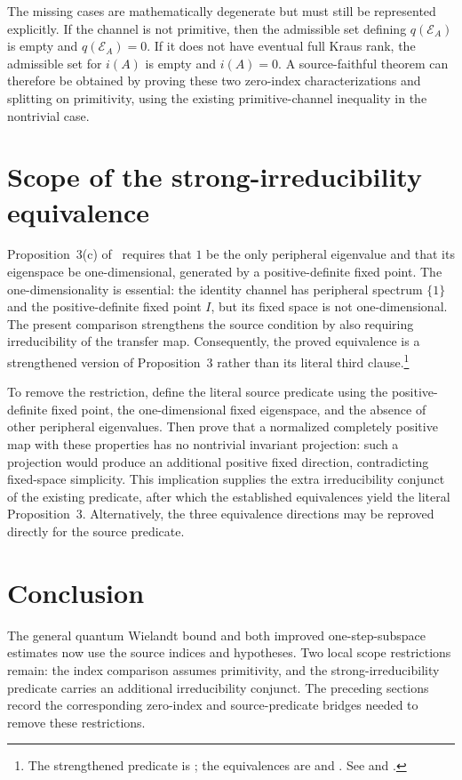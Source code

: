 \documentclass{article}
\begin{document}
The missing cases are mathematically degenerate but must still be represented
explicitly. If the channel is not primitive, then the admissible set defining
$q(\mathcal E_A)$ is empty and $q(\mathcal E_A)=0$. If it does not have
eventual full Kraus rank, the admissible set for $i(A)$ is empty and $i(A)=0$.
A source-faithful theorem can therefore be obtained by proving these two
zero-index characterizations and splitting on primitivity, using the existing
primitive-channel inequality in the nontrivial case.

\section{Scope of the strong-irreducibility equivalence}

Proposition~3(c) of~\cite{Sanz2010Quantum} requires that $1$ be the only
peripheral eigenvalue and that its eigenspace be one-dimensional, generated by
a positive-definite fixed point. The one-dimensionality is essential: the
identity channel has peripheral spectrum $\{1\}$ and the positive-definite fixed
point $I$, but its fixed space is not one-dimensional. The present comparison
strengthens the source condition by also requiring irreducibility of the
transfer map. Consequently, the proved equivalence is a strengthened version
of Proposition~3 rather than its literal third clause.\footnote{The strengthened
    predicate is ; the equivalences
    are  and
    . See
     and
    .}

To remove the restriction, define the literal source predicate using the
positive-definite fixed point, the one-dimensional fixed eigenspace, and the
absence of other peripheral eigenvalues. Then prove that a normalized completely
positive map with these properties has no nontrivial invariant projection: such
a projection would produce an additional positive fixed direction, contradicting
fixed-space simplicity. This implication supplies the extra irreducibility
conjunct of the existing predicate, after which the established equivalences
yield the literal Proposition~3. Alternatively, the three equivalence
directions may be reproved directly for the source predicate.

\section{Conclusion}

The general quantum Wielandt bound and both improved one-step-subspace estimates
now use the source indices and hypotheses. Two local scope restrictions remain:
the index comparison assumes primitivity, and the strong-irreducibility
predicate carries an additional irreducibility conjunct. The preceding sections
record the corresponding zero-index and source-predicate bridges needed to
remove these restrictions.



\end{document}
